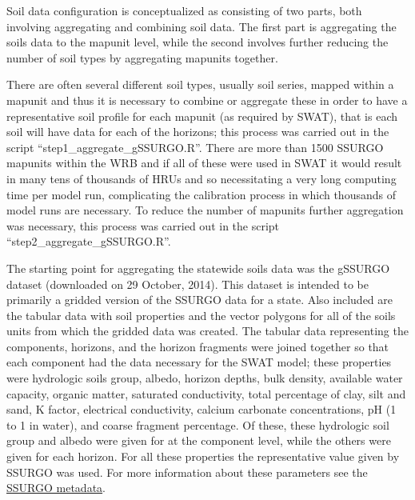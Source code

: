 \documentclass[10pt,letterpaper]{article}%
\begin{document}
		Soil data configuration is conceptualized as consisting of two parts, both involving aggregating and combining soil data. The first part is aggregating the soils data to the mapunit level, while the second involves further reducing the number of soil types by aggregating mapunits together.		
		
		There are often several different soil types, usually soil series, mapped within a mapunit and thus it is necessary to combine or aggregate these in order to have a representative soil profile for each mapunit (as required by SWAT), that is each soil will have data for each of the horizons; this process was carried out in the script ``step1\_aggregate\_gSSURGO.R''. There are more than 1500 SSURGO mapunits within the WRB and if all of these were used in SWAT it would result in many tens of thousands of HRUs and so necessitating a very long computing time per model run, complicating the calibration process in which thousands of model runs are necessary. To reduce the number of mapunits further aggregation was necessary, this process was carried out in the script ``step2\_aggregate\_gSSURGO.R''.
		 
		The starting point for aggregating the statewide soils data was the gSSURGO dataset (downloaded on 29 October, 2014). This dataset is intended to be primarily a gridded version of the SSURGO data for a state. Also included are the tabular data with soil properties and the vector polygons for all of the soils units from which the gridded data was created. The tabular data representing the components, horizons, and the horizon fragments were joined together so that each component had the data necessary for the SWAT model; these properties were hydrologic soils group, albedo, horizon depths, bulk density, available water capacity, organic matter, saturated conductivity, total percentage of clay, silt and sand, K factor, electrical conductivity, calcium carbonate concentrations, pH (1 to 1 in water), and coarse fragment percentage. Of these, these hydrologic soil group and albedo were given for at the component level, while the others were given for each horizon.  For all these properties the representative value given by SSURGO was used. For more information about these parameters see the \href{http://www.nrcs.usda.gov/wps/portal/nrcs/detail/soils/survey/?cid=nrcs142p2_053631}{SSURGO metadata}. 
		
\end{document}
